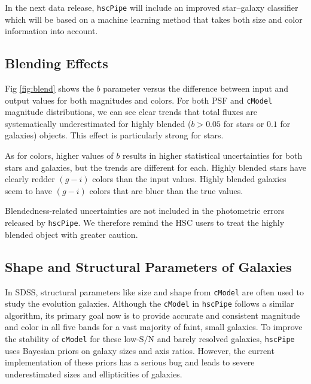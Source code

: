 \documentclass[useamsfonts]{pasj01}
\def\hscpipe{\texttt{hscPipe}}
\def\cmodel{\texttt{cModel}}
\def\s2n{{$\mathrm{S}/\mathrm{N}$}}
\begin{document}
    In the next data release, \hscpipe{} will include an improved star--galaxy 
    classifier which will be based on a machine learning method that takes both 
    size and color information into account. 

\subsection{Blending Effects}
    \label{ssec:blendedness}

    Fig \ref{fig:blend} shows the $b$ parameter versus the difference between input and
    output values for both magnitudes and colors. 
    For both PSF and \cmodel{} magnitude distributions, we can see clear trends that 
    total fluxes are systematically underestimated for highly blended ($b>0.05$ for 
    stars or $0.1$ for galaxies) objects.
    This effect is particularly strong for stars.
    
    As for colors, higher values of $b$ results in higher statistical uncertainties 
    for both stars and galaxies, but the trends are different for each.
    Highly blended stars have clearly redder $(g-i)$ colors than the input values. 
    Highly blended galaxies seem to have $(g-i)$ colors that are bluer than the 
    true values.

    Blendedness-related uncertainties are not included in the photometric errors 
    released by \hscpipe{}.
    We therefore remind the HSC users to treat the highly blended object with
    greater caution.

\subsection{Shape and Structural Parameters of Galaxies}
    \label{ssec:shape}

    In SDSS, structural parameters like size and shape from \cmodel{} are often used to 
    study the evolution galaxies.
    Although the \cmodel{} in \hscpipe{} follows a similar algorithm, its primary
    goal now is to provide accurate and consistent magnitude and color in all five
    bands for a vast majority of faint, small galaxies.
    To improve the stability of \cmodel{} for these low-\s2n{} and barely resolved
    galaxies, \hscpipe{} uses Bayesian priors on galaxy sizes and axis ratios. 
    However, the current implementation of these priors has a serious bug and leads 
    to severe underestimated sizes and ellipticities of galaxies.
    
\end{document}
